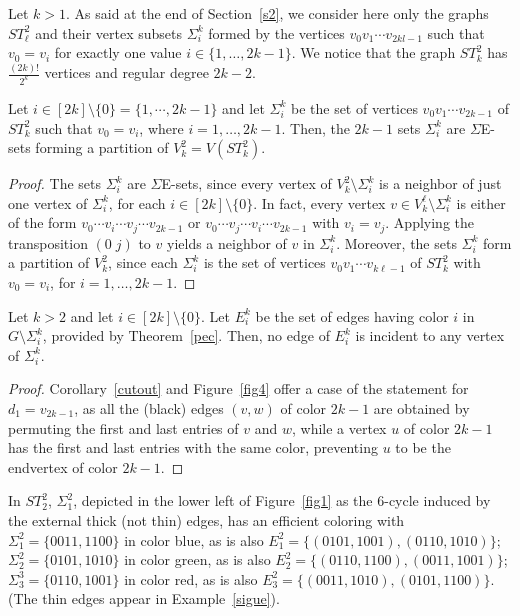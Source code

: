 \documentclass[12pt,reqno]{article}
\begin{document}
Let $k>1$. As said at the end of Section~\ref{s2}, 
we consider here only the graphs $ST^2_\ell$ and their vertex subsets $\Sigma_i^k$ formed by the vertices $v_0v_1\cdots v_{2kl-1}$ such that $v_0=v_i$ for exactly one value $i\in\{1,\ldots,2k-1\}$.
We notice that the graph $ST^2_k$ has $\frac{(2k)!}{2^k}$ vertices and regular degree $2k-2$.

\begin{theorem}\label{ultimo}
Let $i\in[2k]\setminus\{0\}=\{1,\cdots,2k-1\}$ and let $\Sigma_i^k$ be the set of vertices $v_0v_1\cdots v_{2k-1}$ of $ST^2_k$ such that $v_0=v_i$, where $i=1,\ldots,2k-1$. 
Then, the $2k-1$ sets $\Sigma_i^k$ are $\Sigma$E-sets forming a partition of $V_k^2=V(ST^2_k)$. 
\end{theorem}

\begin{proof}
The sets $\Sigma_i^k$ are $\Sigma$E-sets, since every vertex of $V_k^2\setminus\Sigma_i^k$ is a neighbor of just one vertex of $\Sigma_i^k$, for each $i\in[2k]\setminus\{0\}$.
 In fact, every vertex $v\in V_k^\ell\setminus\Sigma_i^k$ is either of the form $v_0\cdots v_i\cdots v_j\cdots v_{2k-1}$ or $v_0\cdots v_j\cdots v_i\cdots v_{2k-1}$ with $v_i=v_j$.
 Applying the transposition $(0\;j)$ to $v$ yields a neighbor of $v$ in $\Sigma_i^k$.
 Moreover, the sets $\Sigma_i^k$  form a partition of $V_k^2$, since each $\Sigma_i^k$ is the set of vertices $v_0v_1\cdots v_{k\ell-1}$ of $ST^2_k$ with $v_0=v_i$, for $i=1,\ldots,2k-1$.
\end{proof}

\begin{theorem}\label{t2}
Let $k>2$ and let $i\in[2k]\setminus\{0\}$. Let $E_i^k$ be the set of edges having color $i$ in $G\setminus\Sigma_i^k$, provided by Theorem~\ref{pec}. Then, no edge of $E_i^k$ is incident to any vertex of $\Sigma_i^k$. 
\end{theorem}

\begin{proof}  Corollary~\ref{cutout} and Figure~\ref{fig4} offer a case of the statement for $d_1=v_{2k-1}$, as all the (black) edges $(v,w)$ of color $2k-1$ are obtained by permuting the first and last entries of $v$ and $w$, while a vertex $u$ of color $2k-1$ has the first and last entries with the same color, preventing $u$ to be the endvertex of color $2k-1$.
\end{proof}

\begin{example}\label{abrazo} In $ST_2^2$,
$\Sigma_1^2$, depicted in the lower left of Figure~\ref{fig1} as the 6-cycle induced by the external thick (not thin) edges, has an efficient coloring with $\Sigma_1^2=\{0011,1100\}$ in color blue, as is also $E_1^2=\{(0101,1001),(0110,1010)\}$; $\Sigma_2^2=\{0101,1010\}$ in color green, as is also $E_2^2=\{(0110,1100),(0011,1001)\}$; $\Sigma_3^3=\{0110,1001\}$ in color red, as is also $E_3^2=\{(0011,1010),(0101,1100)\}$. (The thin edges appear in Example~\ref{sigue}).
\end{example}
\end{document}
